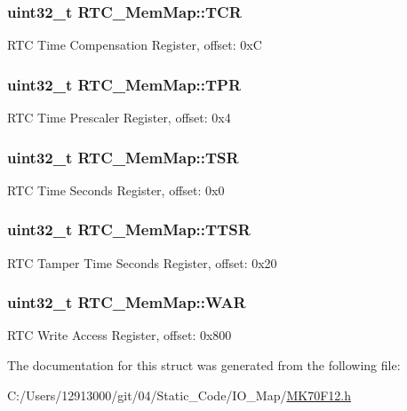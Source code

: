 \subsubsection[{T\+C\+R}]{\setlength{\rightskip}{0pt plus 5cm}uint32\+\_\+t R\+T\+C\+\_\+\+Mem\+Map\+::\+T\+C\+R}\label{struct_r_t_c___mem_map_ab816b0540497796070202cd2f5bc10ed}
R\+T\+C Time Compensation Register, offset\+: 0x\+C \hypertarget{struct_r_t_c___mem_map_a32641b62d548255bdf2164b457a2aaeb}{}
\subsubsection[{T\+P\+R}]{\setlength{\rightskip}{0pt plus 5cm}uint32\+\_\+t R\+T\+C\+\_\+\+Mem\+Map\+::\+T\+P\+R}\label{struct_r_t_c___mem_map_a32641b62d548255bdf2164b457a2aaeb}
R\+T\+C Time Prescaler Register, offset\+: 0x4 \hypertarget{struct_r_t_c___mem_map_a4ca4d2878d99736cbff0e8b107a275f2}{}
\subsubsection[{T\+S\+R}]{\setlength{\rightskip}{0pt plus 5cm}uint32\+\_\+t R\+T\+C\+\_\+\+Mem\+Map\+::\+T\+S\+R}\label{struct_r_t_c___mem_map_a4ca4d2878d99736cbff0e8b107a275f2}
R\+T\+C Time Seconds Register, offset\+: 0x0 \hypertarget{struct_r_t_c___mem_map_a15cd6b1d2a7664e4280746a810d2583f}{}
\subsubsection[{T\+T\+S\+R}]{\setlength{\rightskip}{0pt plus 5cm}uint32\+\_\+t R\+T\+C\+\_\+\+Mem\+Map\+::\+T\+T\+S\+R}\label{struct_r_t_c___mem_map_a15cd6b1d2a7664e4280746a810d2583f}
R\+T\+C Tamper Time Seconds Register, offset\+: 0x20 \hypertarget{struct_r_t_c___mem_map_aa3d2abe1fdd440a05339c38d377a2ee6}{}
\subsubsection[{W\+A\+R}]{\setlength{\rightskip}{0pt plus 5cm}uint32\+\_\+t R\+T\+C\+\_\+\+Mem\+Map\+::\+W\+A\+R}\label{struct_r_t_c___mem_map_aa3d2abe1fdd440a05339c38d377a2ee6}
R\+T\+C Write Access Register, offset\+: 0x800 

The documentation for this struct was generated from the following file\+:\begin{DoxyCompactItemize}
\item 
C\+:/\+Users/12913000/git/04/\+Static\+\_\+\+Code/\+I\+O\+\_\+\+Map/\hyperlink{_m_k70_f12_8h}{M\+K70\+F12.\+h}\end{DoxyCompactItemize}
